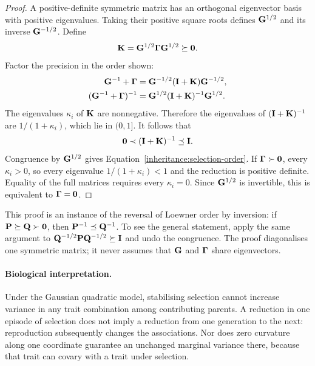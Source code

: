 \begin{proof}
  A positive-definite symmetric matrix has an orthogonal eigenvector basis
  with positive eigenvalues. Taking their positive square roots defines
  $\mathbf{G}^{1/2}$ and its inverse $\mathbf{G}^{-1/2}$. Define
  \begin{equation}
    \mathbf{K}=\mathbf{G}^{1/2}\boldsymbol{\Gamma}\mathbf{G}^{1/2}\succeq\mathbf{0}.
  \end{equation}
  Factor the precision in the order shown:
  \begin{align}
    \mathbf{G}^{-1}+\boldsymbol{\Gamma}
       &=\mathbf{G}^{-1/2}(\mathbf{I}+\mathbf{K})\mathbf{G}^{-1/2},\\
    (\mathbf{G}^{-1}+\boldsymbol{\Gamma})^{-1}
       &=\mathbf{G}^{1/2}(\mathbf{I}+\mathbf{K})^{-1}\mathbf{G}^{1/2}.
    \label{inheritance:whitened-selection}
  \end{align}
  The eigenvalues $\kappa_i$ of $\mathbf{K}$ are nonnegative. Therefore the
  eigenvalues of $(\mathbf{I}+\mathbf{K})^{-1}$ are
  $1/(1+\kappa_i)$, which lie in $(0,1]$. It follows that
  \begin{equation}
    \mathbf{0}\prec(\mathbf{I}+\mathbf{K})^{-1}\preceq\mathbf{I}.
  \end{equation}
  Congruence by $\mathbf{G}^{1/2}$ gives
  Equation~\eqref{inheritance:selection-order}. If $\boldsymbol{\Gamma}\succ\mathbf{0}$,
  every $\kappa_i>0$, so every eigenvalue $1/(1+\kappa_i)<1$ and the
  reduction is positive definite. Equality of the full matrices requires
  every $\kappa_i=0$. Since $\mathbf{G}^{1/2}$ is invertible, this is
  equivalent to $\boldsymbol{\Gamma}=\mathbf{0}$.
\end{proof}

This proof is an instance of the reversal of Loewner order by inversion:
if $\mathbf{P}\succeq\mathbf{Q}\succ\mathbf{0}$, then
$\mathbf{P}^{-1}\preceq\mathbf{Q}^{-1}$. To see the general statement, apply the
same argument to
$\mathbf{Q}^{-1/2}\mathbf{P}\mathbf{Q}^{-1/2}\succeq\mathbf{I}$ and undo the
congruence. The proof diagonalises one symmetric matrix; it never assumes
that $\mathbf{G}$ and $\boldsymbol{\Gamma}$ share eigenvectors.

\paragraph{Biological interpretation.}
Under the Gaussian quadratic model, stabilising selection cannot increase
variance in any trait combination among contributing parents. A reduction in one
episode of selection does not imply a reduction from one generation to the
next: reproduction subsequently changes the associations. Nor does zero
curvature along one coordinate guarantee an unchanged marginal variance
there, because that trait can covary with a trait under selection.

